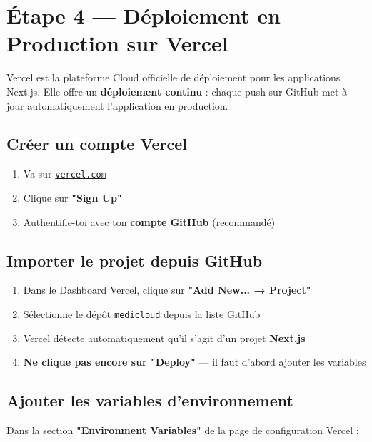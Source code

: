 \documentclass[12pt, a4paper]{article}
\begin{document}
\section{Étape 4 — Déploiement en Production sur Vercel}

Vercel est la plateforme Cloud officielle de déploiement pour les applications
Next.js. Elle offre un \textbf{déploiement continu} : chaque push sur GitHub
met à jour automatiquement l'application en production.

\subsection{Créer un compte Vercel}

\begin{enumerate}[label=\arabic*.]
  \item Va sur \href{https://vercel.com}{\texttt{vercel.com}}
  \item Clique sur \textbf{"Sign Up"}
  \item Authentifie-toi avec ton \textbf{compte GitHub} (recommandé)
\end{enumerate}

\subsection{Importer le projet depuis GitHub}

\begin{enumerate}[label=\arabic*.]
  \item Dans le Dashboard Vercel, clique sur \textbf{"Add New... → Project"}
  \item Sélectionne le dépôt \texttt{medicloud} depuis la liste GitHub
  \item Vercel détecte automatiquement qu'il s'agit d'un projet \textbf{Next.js}
  \item \textbf{Ne clique pas encore sur "Deploy"} — il faut d'abord ajouter les variables
\end{enumerate}

\subsection{Ajouter les variables d'environnement}

Dans la section \textbf{"Environment Variables"} de la page de configuration Vercel :
\end{document}
